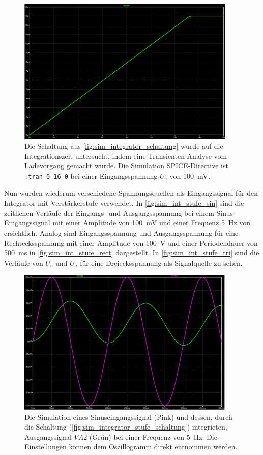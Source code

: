 \documentclass[12pt,english,ngerman]{scrartcl}
\begin{document}
\begin{figure}[H]
  \centering
    \includegraphics[width=\linewidth, height=7cm]{./figures/integrator/sim/mit_stufe/100mv_aus_zeit.png}
  \caption{Die Schaltung aus \autoref{fig:sim_integrator_schaltung} wurde auf
  die Integrationszeit untersucht, indem eine Transienten-Analyse vom
  Ladevorgang gemacht wurde. Die Simulation SPICE-Directive ist \texttt{.tran 0 16 0} 
  bei einer Eingangsspannung $U_e$ von \SI{100}{\milli\volt}.}
  \label{fig:sim_integrator_stufe_integrationszeit}
\end{figure}

Nun wurden wiederum verschiedene Spannungsquellen als Eingangssignal für den
Integrator mit Verstärkerstufe verwendet. In \autoref{fig:sim_int_stufe_sin}
sind die zeitlichen Verläufe der Eingangs- und Ausgangsspannung bei einem
Sinus-Eingangssignal mit einer Amplitude von \SI{100}{\milli\volt} und einer
Frequenz \SI{5}{\hertz} von ersichtlich. Analog sind Eingangsspannung und
Ausgangsspannung für eine Rechtecksspannung mit einer Amplitude von
\SI{100}{\volt} und einer Periodendauer von \SI{500}{\milli\second} in
\autoref{fig:sim_int_stufe_rect} dargestellt. In
\autoref{fig:sim_int_stufe_tri} sind die Verläufe von $U_e$ und $U_a$ für eine
Dreiecksspannung als Signalquelle zu sehen.

\begin{figure}[H]
  \centering
    \includegraphics[width=\linewidth, height=7cm]{./figures/integrator/sim/mit_stufe/sin100mv_5hz.png}
  \caption{Die Simulation eines Sinuseingangssignal (Pink) und dessen, durch
  die Schaltung (\autoref{fig:sim_integrator_stufe_schaltung}) integrieten,
  Ausgangssignal $VA2$ (Grün) bei einer Frequenz von \SI{5}{\hertz}. Die
  Einstellungen können dem Oszillogramm direkt entnommen werden.}
  \label{fig:sim_int_stufe_sin}
\end{figure}
\end{document}
